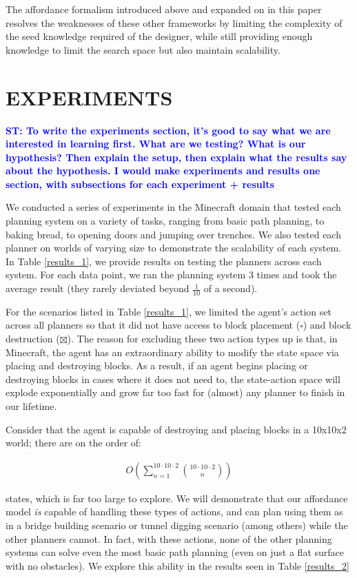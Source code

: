 \documentclass[]{article}
\newcommand{\stnote}[1]{\textcolor{Blue}{\textbf{ST: #1}}}
\begin{document}
The affordance formalism introduced above and expanded on in this
paper resolves the weaknesses of these other frameworks by limiting
the complexity of the seed knowledge required of the designer, while
still providing enough knowledge to limit the search space but also
maintain scalability.

\section{EXPERIMENTS}

\stnote{To write the experiments section, it's good to say what we are
  interested in learning first.  What are we testing?  What is our
  hypothesis?  Then explain the setup, then explain what the results
  say about the hypothesis.  I would make experiments and results one
  section, with subsections for each experiment + results}

We conducted a series of experiments in the Minecraft domain that
tested each planning system on a variety of tasks, ranging from basic
path planning, to baking bread, to opening doors and jumping over
trenches.  We also tested each planner on worlds of varying size to
demonstrate the scalability of each system. In Table \ref{results_1},
we provide results on testing the planners across each system. For
each data point, we ran the planning system 3 times and took the
average result (they rarely deviated beyond $\frac{1}{10}$ of a
second).

For the scenarios listed in Table \ref{results_1}, we limited the agent's 
action set across all planners so that it did not have access to block 
placement ($\square$) and block destruction ($\boxtimes$). The reason 
for excluding these two action types up is that, in Minecraft, the agent 
has an extraordinary ability to modify the state space via placing and 
destroying blocks. As a result, if an agent begins placing or destroying 
blocks in cases where it does not need to, the state-action space will 
explode exponentially and grow far too fast for (almost) any planner to 
finish in our lifetime. 

Consider that the agent is capable of destroying and placing blocks 
in a 10x10x2 world; there are on the order of:

\begin{align}
O\left(\sum_{n=1}^{10 \cdot 10 \cdot 2} \binom{10 \cdot 10 \cdot 2}{n}\right)
\label{eq:mc_explode}
\end{align}

states, which is far too large to explore. We will demonstrate that our 
affordance model {\it is} capable of handling these types of actions, 
and can plan using them as in a bridge building scenario or tunnel 
digging scenario (among others) while the other planners cannot. 
In fact, with these actions, none of the other planning systems 
can solve even the most basic path planning (even on just a flat 
surface with no obstacles). We explore this ability in the results 
seen in Table \ref{results_2}
\end{document}
